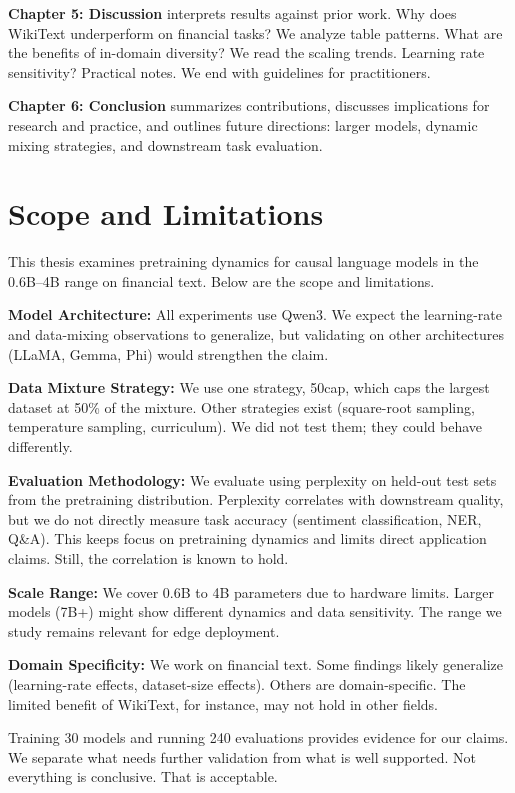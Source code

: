 \textbf{Chapter 5: Discussion} interprets results against prior work. Why does WikiText underperform on financial tasks? We analyze table patterns. What are the benefits of in-domain diversity? We read the scaling trends. Learning rate sensitivity? Practical notes. We end with guidelines for practitioners.

\textbf{Chapter 6: Conclusion} summarizes contributions, discusses implications for research and practice, and outlines future directions: larger models, dynamic mixing strategies, and downstream task evaluation.

\section{Scope and Limitations}

This thesis examines pretraining dynamics for causal language models in the 0.6B--4B range on financial text. Below are the scope and limitations.

\textbf{Model Architecture:} All experiments use Qwen3. We expect the learning-rate and data-mixing observations to generalize, but validating on other architectures (LLaMA, Gemma, Phi) would strengthen the claim.

\textbf{Data Mixture Strategy:} We use one strategy, 50cap, which caps the largest dataset at 50\% of the mixture. Other strategies exist (square-root sampling, temperature sampling, curriculum). We did not test them; they could behave differently.

\textbf{Evaluation Methodology:} We evaluate using perplexity on held-out test sets from the pretraining distribution. Perplexity correlates with downstream quality, but we do not directly measure task accuracy (sentiment classification, NER, Q\&A). This keeps focus on pretraining dynamics and limits direct application claims. Still, the correlation is known to hold.

\textbf{Scale Range:} We cover 0.6B to 4B parameters due to hardware limits. Larger models (7B+) might show different dynamics and data sensitivity. The range we study remains relevant for edge deployment.

\textbf{Domain Specificity:} We work on financial text. Some findings likely generalize (learning-rate effects, dataset-size effects). Others are domain-specific. The limited benefit of WikiText, for instance, may not hold in other fields.

Training 30 models and running 240 evaluations provides evidence for our claims. We separate what needs further validation from what is well supported. Not everything is conclusive. That is acceptable.

